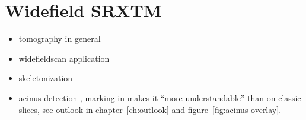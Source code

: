 \section{Widefield SRXTM}
\begin{itemize}
	\item tomography in general
	\item widefieldscan application
	\item skeletonization
	\item acinus detection \threed, marking in \twod makes it ``more understandable'' than on classic slices, see outlook in chapter~\ref{ch:outlook} and figure~\ref{fig:acinus overlay}.
\end{itemize}
\vspace{52mm}